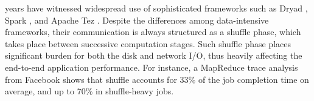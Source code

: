  years have witnessed widespread use of sophisticated frameworks such as Dryad \cite{dryad}, Spark \cite{spark}, and Apache Tez \cite{tez}.
Despite the differences among data-intensive frameworks, their communication is always structured as a shuffle phase,  which takes place between successive computation stages. Such shuffle phase places significant burden for both the disk and network I/O, thus heavily affecting the end-to-end application performance. For instance, a MapReduce trace analysis from Facebook shows that shuffle accounts for 33\% of the job completion time on average, and up to 70\% in shuffle-heavy jobs\cite{managing}.

